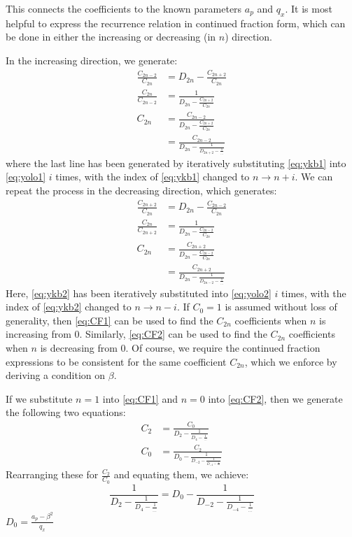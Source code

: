 \documentclass{article}
\begin{document}
This connects the coefficients to the known parameters $a_p$ and $q_x$. It is most helpful to express the recurrence relation in continued fraction form, which can be done in either the increasing or decreasing (in $n$) direction.\par
\medskip
\noindent In the increasing direction, we generate:
\begin{align}
	\frac{C_{2n-2}}{C_{2n}} & = D_{2n} - \frac{C_{2n + 2}}{C_{2n}} \nonumber \\
	\frac{C_{2n}}{C_{2n - 2}} & = \frac{1}{D_{2n} - \frac{C_{2n + 2}}{C_{2n}}} \label{eq:ykb1} \\
	C_{2n} & = \frac{C_{2n - 2}}{D_{2n} - \frac{C_{2n + 2}}{C_{2n}}} \label{eq:yolo1} \\
	& = \frac{C_{2n - 2}}{D_{2n} - \frac{1}{D_{2n+2} - \frac{1}{\dots}}} \label{eq:CF1}
\end{align}
where the last line has been generated by iteratively substituting \eqref{eq:ykb1} into \eqref{eq:yolo1} $i$ times, with the index of \eqref{eq:ykb1} changed to $n \rightarrow n + i$. We can repeat the process in the decreasing direction, which generates:
\begin{align}
\frac{C_{2n + 2}}{C_{2n}} & = D_{2n} - \frac{C_{2n - 2}}{C_{2n}}	 \nonumber \\
\frac{C_{2n}}{C_{2n + 2}} & = \frac{1}{D_{2n} - \frac{C_{2n - 2}}{C_{2n}}} \label{eq:ykb2} \\
C_{2n} & = \frac{C_{2n + 2}}{D_{2n} - \frac{C_{2n - 2}}{C_{2n}}} \label{eq:yolo2} \\
& = \frac{C_{2n + 2}}{D_{2n} - \frac{1}{D_{2n-2} - \frac{1}{\dots}}} \label{eq:CF2}
\end{align}
Here, \eqref{eq:ykb2} has been iteratively substituted into \eqref{eq:yolo2} $i$ times, with the index of \eqref{eq:ykb2} changed to $n \rightarrow n - i$. If $C_{0} = 1$ is assumed without loss of generality, then \eqref{eq:CF1} can be used to find the $C_{2n}$ coefficients when $n$ is increasing from 0. Similarly, \eqref{eq:CF2} can be used to find the $C_{2n}$ coefficients when $n$ is decreasing from 0. Of course, we require the continued fraction expressions to be consistent for the same coefficient $C_{2n}$, which we enforce by deriving a condition on $\beta$. \par
\medskip
\noindent If we substitute $n = 1$ into \eqref{eq:CF1} and $n = 0$ into \eqref{eq:CF2}, then we generate the following two equations:
\begin{align}
C_2 & = \frac{C_0}{D_2 - \frac{1}{D_4 - \frac{1}{\dots}}} \\
C_0 & = \frac{C_2}{D_0 - \frac{1}{D_{-2} - \frac{1}{D_{-4} - \frac{1}{\dots}}}}
\end{align}
Rearranging these for $\frac{C_2}{C_0}$ and equating them, we achieve:
\begin{equation}
\frac{1}{D_2 - \frac{1}{D_4 - \frac{1}{\dots}}}	= D_0 - \frac{1}{D_{-2} - \frac{1}{D_{-4} - \frac{1}{\dots}}}
\end{equation}
$D_0 = \frac{a_p - \beta^2}{q_x}$ 
 
\end{document}
